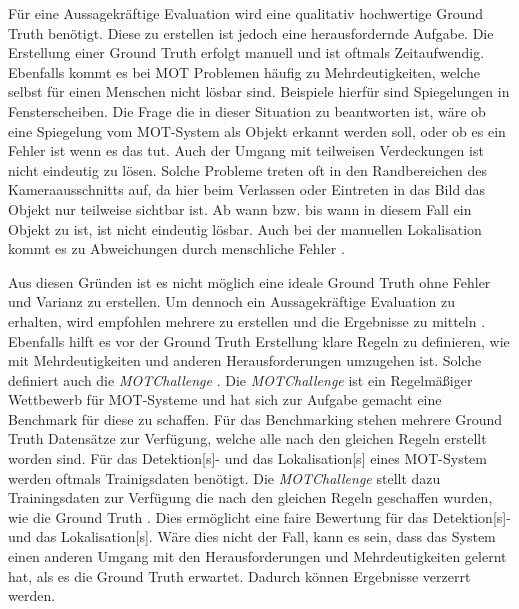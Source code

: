 Für eine Aussagekräftige Evaluation wird eine qualitativ hochwertige \gls{Ground Truth} benötigt. Diese zu erstellen ist jedoch eine herausfordernde Aufgabe. Die Erstellung einer \gls{Ground Truth} erfolgt manuell und ist oftmals Zeitaufwendig. Ebenfalls kommt es bei \gls{MOT} Problemen häufig zu Mehrdeutigkeiten, welche selbst für einen Menschen nicht lösbar sind. Beispiele hierfür sind Spiegelungen in Fensterscheiben. Die Frage die in dieser Situation zu beantworten ist, wäre ob eine Spiegelung vom \gls{MOT}-System als Objekt erkannt werden soll, oder ob es ein Fehler ist wenn es das tut. Auch der Umgang mit teilweisen Verdeckungen ist nicht eindeutig zu lösen. Solche Probleme treten oft in den Randbereichen des Kameraausschnitts auf, da hier beim Verlassen oder Eintreten in das Bild das Objekt nur teilweise sichtbar ist. Ab wann bzw. bis wann in diesem Fall ein Objekt zu  ist, ist nicht eindeutig lösbar. Auch bei der manuellen \gls{Lokalisation} kommt es zu Abweichungen durch menschliche Fehler \cite{MOT15, Milan.2013}.  \par


Aus diesen Gründen ist es nicht möglich eine ideale \gls{Ground Truth} ohne Fehler und Varianz zu erstellen. Um dennoch ein Aussagekräftige Evaluation zu erhalten, wird empfohlen mehrere  zu erstellen und die Ergebnisse zu mitteln \cite{Milan.2013}. Ebenfalls hilft es vor der \gls{Ground Truth} Erstellung klare Regeln zu definieren, wie mit Mehrdeutigkeiten und anderen Herausforderungen umzugehen ist. Solche definiert auch die \textit{MOTChallenge} \cite{MOT16, MOT20}. Die \textit{MOTChallenge} ist ein Regelmäßiger Wettbewerb für \gls{MOT}-Systeme und hat sich zur Aufgabe gemacht eine Benchmark für diese zu schaffen. Für das Benchmarking stehen mehrere \gls{Ground Truth} Datensätze zur Verfügung, welche alle nach den gleichen Regeln erstellt worden sind. Für das \gls{Detektion}[s]- und das \gls{Lokalisation}[s] eines \gls{MOT}-System werden oftmals Trainigsdaten benötigt. Die \textit{MOTChallenge} stellt dazu Trainingsdaten zur Verfügung die nach den gleichen Regeln geschaffen wurden, wie die \gls{Ground Truth} \cite{MOT16, MOT20}. Dies ermöglicht eine faire Bewertung für das \gls{Detektion}[s]- und das \gls{Lokalisation}[s]. Wäre dies nicht der Fall, kann es sein, dass das System einen anderen Umgang mit den Herausforderungen und Mehrdeutigkeiten gelernt hat, als es die \gls{Ground Truth} erwartet. Dadurch können Ergebnisse verzerrt werden. \par

